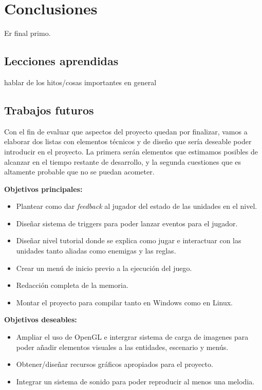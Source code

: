 \chapter{Conclusiones}
Er final primo.

\section{Lecciones aprendidas}
hablar de los hitos/cosas importantes en general

\section{Trabajos futuros}
Con el fin de evaluar que aspectos del proyecto quedan por finalizar, vamos a elaborar dos
listas con elementos técnicos y de diseño que sería deseable poder introducir en el proyecto.
La primera serán elementos que estimamos posibles de alcanzar en el tiempo restante de
desarrollo, y la segunda cuestiones que es altamente probable que no se puedan acometer.

\textbf{Objetivos principales:}
\begin{itemize}
	\item Plantear como dar \textit{feedback} al jugador del estado de las unidades en el nivel.

	\item Diseñar sistema de triggers para poder lanzar eventos para el jugador.

	\item Diseñar nivel tutorial donde se explica como jugar e interactuar con las unidades
	tanto aliadas como enemigas y las reglas.

	\item Crear un menú de inicio previo a la ejecución del juego.

	\item Redacción completa de la memoria.

	\item Montar el proyecto para compilar tanto en Windows como en Linux.
\end{itemize}

\textbf{Objetivos deseables:}
\begin{itemize}
	\item Ampliar el uso de OpenGL e intergrar sistema de carga de imagenes para poder añadir
	elementos visuales a las entidades, escenario y menús.

	\item Obtener/diseñar recursos gráficos apropiados para el proyecto.

	\item Integrar un sistema de sonido para poder reproducir al menos una melodia.
\end{itemize}